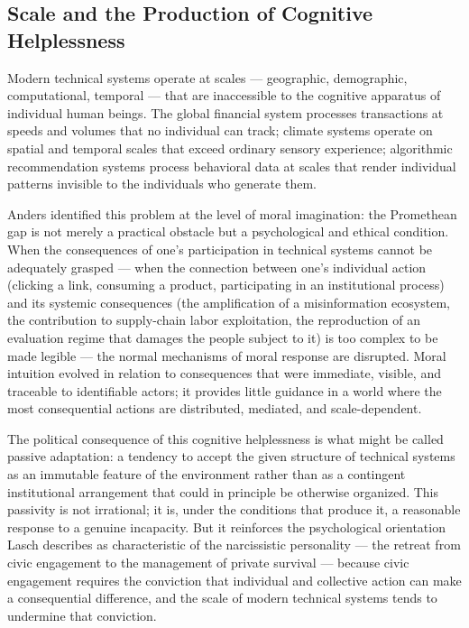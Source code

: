 \documentclass[12pt]{memoir}
\begin{document}
\subsection{Scale and the Production of Cognitive Helplessness}

Modern technical systems operate at scales — geographic, demographic, computational,
temporal — that are inaccessible to the cognitive apparatus of individual human beings.
The global financial system processes transactions at speeds and volumes that no
individual can track; climate systems operate on spatial and temporal scales that
exceed ordinary sensory experience; algorithmic recommendation systems process
behavioral data at scales that render individual patterns invisible to the individuals
who generate them.

Anders identified this problem at the level of moral imagination: the Promethean gap
is not merely a practical obstacle but a psychological and ethical condition. When the
consequences of one's participation in technical systems cannot be adequately grasped —
when the connection between one's individual action (clicking a link, consuming a
product, participating in an institutional process) and its systemic consequences (the
amplification of a misinformation ecosystem, the contribution to supply-chain labor
exploitation, the reproduction of an evaluation regime that damages the people subject
to it) is too complex to be made legible — the normal mechanisms of moral response
are disrupted. Moral intuition evolved in relation to consequences that were immediate,
visible, and traceable to identifiable actors; it provides little guidance in a world
where the most consequential actions are distributed, mediated, and scale-dependent.

The political consequence of this cognitive helplessness is what might be called
passive adaptation: a tendency to accept the given structure of technical systems as
an immutable feature of the environment rather than as a contingent institutional
arrangement that could in principle be otherwise organized. This passivity is not
irrational; it is, under the conditions that produce it, a reasonable response to a
genuine incapacity. But it reinforces the psychological orientation Lasch describes
as characteristic of the narcissistic personality — the retreat from civic engagement
to the management of private survival — because civic engagement requires the
conviction that individual and collective action can make a consequential difference,
and the scale of modern technical systems tends to undermine that conviction.
\end{document}

